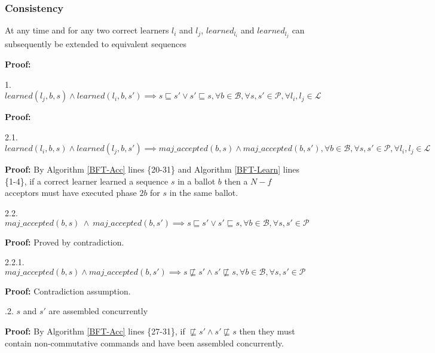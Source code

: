 \subsubsection{Consistency}
\begin{theorem}At any time and for any two correct learners $l_i$ and $l_j$, $learned_{l_i}$ and $learned_{l_j}$ can subsequently be extended to equivalent sequences \par
\end{theorem} 
\textbf{Proof:} \par
1. $learned(l_j,b,s) \land learned(l_i,b,s') \implies s \sqsubseteq s' \lor s' \sqsubseteq s, \forall b \in \mathcal{B}, \forall s,s' \in \mathcal{P}, \forall l_i,l_j \in \mathcal{L}$ \par
\indent\indent\textbf{Proof:} \par
\indent\indent\indent\parbox{\linewidth}{2.1. $learned(l_i,b,s) \land learned(l_j,b,s') \implies maj\_accepted(b,s) \land maj\_accepted(b,s'), \forall b \in \mathcal{B}, \forall s,s' \in \mathcal{P}, \forall l_i,l_j \in \mathcal{L}$ } \par
\indent\indent\indent\indent\parbox{\linewidth}{\textbf{Proof:} By Algorithm \ref{BFT-Acc} lines \{20-31\} and Algorithm \ref{BFT-Learn} lines \{1-4\}, if a correct learner learned a sequence $s$ in a ballot $b$ then a $N-f$ acceptors must have executed phase $2b$ for $s$ in the same ballot.}\par
\indent\indent\indent\parbox{\linewidth}{2.2. $maj\_accepted(b,s)\ \land\ maj\_accepted(b,s') \implies s \sqsubseteq s' \lor s' \sqsubseteq s, \forall b \in \mathcal{B}, \forall s,s' \in \mathcal{P}$}\par
\indent\indent\indent\indent\textbf{Proof:} Proved by contradiction.\par
\indent\indent\indent\indent\indent\parbox{\linewidth}{2.2.1. $maj\_accepted(b,s) \land maj\_accepted(b,s') \implies s \not\sqsubseteq s' \land s' \not\sqsubseteq s, \forall b \in \mathcal{B}, \forall s,s' \in \mathcal{P}$} \par
\indent\indent\indent\indent\indent\indent\textbf{Proof:} Contradiction assumption.\par
\indent\indent\indent\indent{}.2. $s$ and $s'$ are assembled concurrently \par
\indent\indent\indent\indent\indent\indent \parbox{\linewidth}{\textbf{Proof:} By Algorithm \ref{BFT-Acc} lines \{27-31\}, if $\not\sqsubseteq s' \land s' \not\sqsubseteq s$ then they must contain non-commutative commands and have been assembled concurrently.}\par
